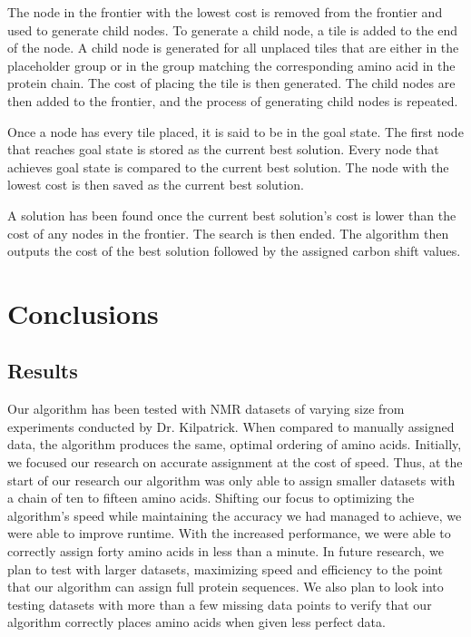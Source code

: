 \documentclass[12pt]{article}
\begin{document}
The node in the frontier with the lowest cost is removed from the frontier and used to generate child nodes. To generate a child node, a tile is added to the end of the node. A child node is generated for all unplaced tiles that are either in the placeholder group or in the group matching the corresponding amino acid in the protein chain. The cost of placing the tile is then generated.  The child nodes are then added to the frontier, and the process of generating child nodes is repeated. 

Once a node has every tile placed, it is said to be in the goal state. The first node that reaches goal state is stored as the current best solution. Every node that achieves goal state is compared to the current best solution. The node with the lowest cost is then saved as the current best solution. 

A solution has been found once the current best solution's cost is lower than the cost of any nodes in the frontier. The search is then ended. The algorithm then outputs the cost of the best solution followed by the assigned carbon shift values. 

\section{Conclusions}
\label{sec:conclusions}

\subsection{Results}
\label{sub:results}
Our algorithm has been tested with NMR datasets of varying size from experiments conducted by Dr. Kilpatrick.  When compared to manually assigned data, the algorithm produces the same, optimal ordering of amino acids. Initially, we focused our research on accurate assignment at the cost of speed. Thus, at the start of our research our algorithm was only able to assign smaller datasets with a chain of ten to fifteen amino acids. Shifting our focus to optimizing the algorithm's speed while maintaining the accuracy we had managed to achieve, we were able to improve runtime. With the increased performance, we were able to correctly assign forty amino acids in less than a minute. In future research, we plan to test with larger datasets, maximizing speed and efficiency to the point that our algorithm can assign full protein sequences. We also plan to look into testing datasets with more than a few missing data points to verify that our algorithm correctly places amino acids when given less perfect data.  
\end{document}
